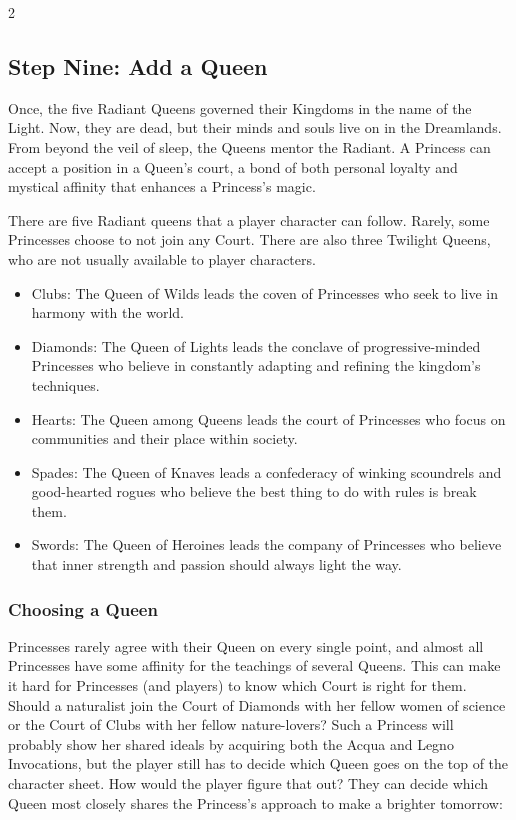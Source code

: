\begin{multicols}{2}
\subsection*{Step Nine: Add a Queen}

Once, the five Radiant Queens governed their Kingdoms in the name of the Light. Now, they are dead, but their minds and souls live on in the Dreamlands. From beyond the veil of sleep, the Queens mentor the Radiant. A Princess can accept a position in a Queen's court, a bond of both personal loyalty and mystical affinity that enhances a Princess's magic. 

There are five Radiant queens that a player character can follow. Rarely, some Princesses choose to not join any Court. There are also three Twilight Queens, who are not usually available to player characters. 

\begin{itemize}
\item Clubs: The Queen of Wilds leads the coven of Princesses who seek to live in harmony with the world.
\item Diamonds: The Queen of Lights leads the conclave of progressive-minded Princesses who believe in constantly adapting and refining the kingdom's techniques.
\item Hearts: The Queen among Queens leads the court of Princesses who focus on communities and their place within society.
\item Spades: The Queen of Knaves leads a confederacy of winking scoundrels and good-hearted rogues who believe the best thing to do with rules is break them.
\item Swords: The Queen of Heroines leads the company of Princesses who believe that inner strength and passion should always light the way. 
\end{itemize}

\bigsidebarstart
 
\subsubsection*{Choosing a Queen}
Princesses rarely agree with their Queen on every single point, and almost all Princesses have some affinity for the teachings of several Queens. This can make it hard for Princesses (and players) to know which Court is right for them. Should a naturalist join the Court of Diamonds with her fellow women of science or the Court of Clubs with her fellow nature-lovers? Such a Princess will probably show her shared ideals by acquiring both the Acqua and Legno Invocations, but the player still has to decide which Queen goes on the top of the character sheet. How would the player figure that out? They can decide which Queen most closely shares the Princess's approach to make a brighter tomorrow:


\end{multicols}
